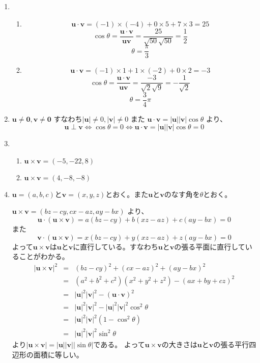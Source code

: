 \documentclass{jarticle}
\begin{document}
\begin{enumerate}
  \item
    \begin{enumerate}
      \item 
        \[ \bm u \cdot \bm v = (-1) \times (-4) + 0 \times 5 + 7 \times 3 = 25 \]
        \[ \cos \theta = \frac { \bm u \cdot \bm v } { \bm u \bm v } = \frac { 25 } { \sqrt{50} \sqrt{50} } = \frac{1}{2} \]
        \[ \theta = \frac{\pi}{3} \]
      \item
        \[ \bm u \cdot \bm v = (-1) \times 1 + 1 \times (-2) + 0 \times 2 = -3\] 
        \[ \cos \theta = \frac { \bm u \cdot \bm v } { \bm u \bm v } = \frac { -3 } { \sqrt 2 \sqrt 9 } = - \frac { 1 } { \sqrt 2 } \]
        \[ \theta = \frac{3}{4} \pi \]
    \end{enumerate}
  \item
    $\bm u \neq \bm 0, \bm v \neq \bm 0$ すなわち$|\bm u| \neq 0, |\bm v| \neq 0$ また $\bm u \cdot \bm v = |\bm u| |\bm v| \cos \theta$ より、
  \[ \bm u \perp \bm v \iff \cos \theta = 0 \iff \bm u \cdot \bm v = |\bm u| |\bm v| \cos \theta = 0 \]
  \item
    \begin{enumerate}
      \item $\bm u \times \bm v = (-5,-22,8)$
      \item $\bm u \times \bm v = (4,-8,-8)$
    \end{enumerate}
  
  \item
    $\bm u = (a,b,c)$と$\bm v=(x,y,z)$とおく。また$\bm u$と$\bm v$のなす角を$\theta$とおく。
    
    $\bm u \times \bm v = (bz-cy,cx-az,ay-bx)$ より、
    \[ \bm u \cdot (\bm u \times \bm v) = a(bz-cy)+b(xz-az)+c(ay-bx) = 0\]
    また
    \[ \bm v \cdot (\bm u \times \bm v) = x(bz-cy)+y(xz-az)+z(ay-bx) = 0\]
    よって$\bm u \times \bm v$は$\bm u$と$\bm v$に直行している。すなわち$\bm u$と$\bm v$の張る平面に直行していることがわかる。
    \begin{eqnarray*}
      |\bm u \times \bm v|^2 & = & (bz-cy)^2+(cx-az)^2+(ay-bx)^2 \\
      & = & (a^2+b^2+c^2)(x^2+y^2+z^2) - (ax+by+cz)^2 \\
      & = & |\bm u|^2 |\bm v|^2 - (\bm u \cdot \bm v)^2 \\ 
      & = & |\bm u|^2 |\bm v|^2 - |\bm u|^2 |\bm v|^2 \cos^2 \theta \\
      & = & |\bm u|^2 |\bm v|^2 ( 1 - \cos^2 \theta) \\
      & = & |\bm u|^2 |\bm v|^2 \sin^2 \theta
    \end{eqnarray*}
    より$|\bm u \times \bm v| = |\bm u||\bm v| |\sin \theta|$である。
    よって$\bm u \times \bm v$の大きさは$\bm u$と$\bm v$の張る平行四辺形の面積に等しい。
    

\end{enumerate}
\end{document}
